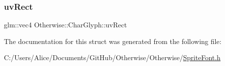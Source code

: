 \mbox{\label{struct_otherwise_1_1_char_glyph_ada3858aad815179db054b96380c0110d}} 
\subsubsection{\texorpdfstring{uv\+Rect}{uvRect}}
{\footnotesize\ttfamily glm\+::vec4 Otherwise\+::\+Char\+Glyph\+::uv\+Rect}



The documentation for this struct was generated from the following file\+:\begin{DoxyCompactItemize}
\item 
C\+:/\+Users/\+Alice/\+Documents/\+Git\+Hub/\+Otherwise/\+Otherwise/\hyperlink{_sprite_font_8h}{Sprite\+Font.\+h}\end{DoxyCompactItemize}
